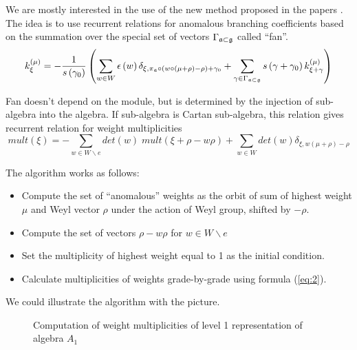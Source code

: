 \documentclass[a4paper,12pt]{article}
\theoremstyle{definition} \newtheorem{Def}{Definition}
\begin{document}
We are mostly interested in the use of the new method proposed in the papers
\cite{lyakhovsky1996rra,lyakhovsky2007dub,ilyin812pbc,kulish4sfa}. The
idea is to use recurrent relations for anomalous branching
coefficients based on the summation over the special
set of vectors $\Gamma_{\frak{a}\subset \frak{g}} $ called ``fan''.
\begin{equation}
  \label{recurrent-relation}
  k_{\xi }^{\left( \mu \right) }=-\frac{1}{s\left( \gamma _{0}\right) }\left(
    \sum_{w\in W}\epsilon \left( w\right) \delta _{\xi ,\pi _{\frak{a}}\circ
      \left( w\circ (\mu +\rho )-\rho \right) +\gamma _{0}}+\sum_{\gamma \in
      \Gamma _{\frak{a}\subset \frak{g}}}s\left( \gamma +\gamma _{0}\right) k_{\xi
      +\gamma }^{\left( \mu \right) }\right)   
\end{equation}

Fan doesn't depend on the module, but
is determined by the injection of sub-algebra into the algebra. If 
sub-algebra is Cartan sub-algebra, this relation gives recurrent
relation for weight multiplicities
\begin{equation}
  \label{eq:2}
  mult(\xi)=-\sum_{w\in W\backslash e}det(w)\;mult(\xi+\rho-w\rho)+\sum_{w\in W}det(w)\delta_{\xi,w(\mu+\rho)-\rho}
\end{equation}

The algorithm works as follows:
\begin{itemize}
\item Compute the set of ``anomalous'' weights as the orbit of sum of
  highest weight $\mu$ and Weyl vector $\rho$ under the action of Weyl
  group, shifted by $-\rho$.
\item Compute the set of vectors $\rho-w\rho$ for $w\in W\backslash e$
\item Set the multiplicity of highest weight equal to 1 as the initial condition.
\item Calculate multiplicities of weights grade-by-grade using formula (\ref{eq:2}).
\end{itemize}

We could illustrate the algorithm with the picture.
\begin{figure}[bh]
  \noindent{}
  \caption{Computation of weight multiplicities of level 1
    representation of algebra $A_1$}
  \label{A1 with star}
\end{figure}
\end{document}
